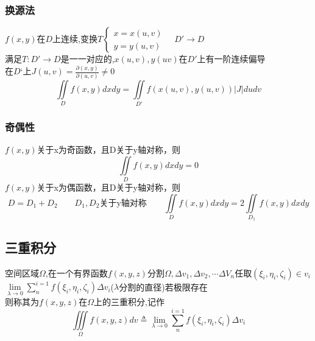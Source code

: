 \subsubsection{换源法}
$f(x,y)$在$D$上连续,\quad 变换$T\begin{cases}
	x=x(u,v)\\
	y=y(u,v)
\end{cases}\quad D'\to D$\\
满足$T: D'\to D$是一一对应的,\quad$x(u,v),y(uv)$在$D'$上有一阶连续偏导\\
在$D‘$上$J(u,v)=\frac{\partial(x,y)}{\partial(u,v)}\neq 0$
\begin{equation}
	\iint\limits_{D}f(x,y)dxdy=\iint\limits_{D'}f(x(u,v),y(u,v))|J|dudv
\end{equation}
\subsubsection{奇偶性}
$f(x,y)$关于x为奇函数，且D关于y轴对称，则
$$\iint\limits_{D}f(x,y)dxdy=0$$
$f(x,y)$关于x为偶函数，且D关于y轴对称，则\\
$$D=D_1+D_2\qquad D_1,D_2 \mbox{关于y轴对称}\qquad
\iint\limits_{D}f(x,y)dxdy=2\iint\limits_{D_1}f(x,y)dxdy$$
\subsection{三重积分}
空间区域$\Omega$,在一个有界函数$f(x,y,z)$分割$\Omega,\Delta v_1,\Delta v_2,\cdots\Delta V_n$任取$(\xi_i,\eta_i,\zeta_i)\in v_i$\\
$\lim\limits_{\lambda\to 0}\sum\limits_{n}^{i=1}f(\xi_i,\eta_i,\zeta_i)\Delta v_i$\quad($\lambda$分割的直径)若极限存在\\
则称其为$f(x,y,z)$在$\Omega$上的三重积分,记作
$$\iiint\limits_{\Omega}f(x,y,z)d v\triangleq\lim\limits_{\lambda\to 0}\sum\limits_{n}^{i=1}f(\xi_i,\eta_i,\zeta_i)\Delta v_i$$